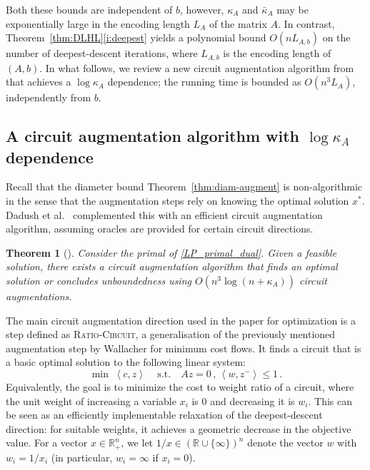 \documentclass[11pt, a4paper]{article}
\newcommand{\pr}[2]{\left\langle #1, #2 \right\rangle}
\newcommand{\1}{\mathbbm{1}}
\newtheorem{theorem}{Theorem}[section]
\theoremstyle{case}
\newcommand{\R}{\mathbb{R}}
\begin{document}
Both these bounds are independent of $b$, however, $\kappa_A$ and $\bar\kappa_A$ may be exponentially large in the encoding length $L_A$ of the matrix $A$. In contrast, Theorem~\ref{thm:DLHL}\ref{i:deepest} yields a polynomial bound $O(n L_{A,b})$ on the number of deepest-descent iterations, where $L_{A,b}$ is the encoding length of $(A,b)$. In what follows, we review a new circuit augmentation algorithm from \cite{dadush2021circuit} that achieves a $\log\kappa_A$ dependence; the running time is bounded as $O(n^3 L_A)$, independently from $b$.

\subsection{A circuit augmentation algorithm with $\log\kappa_A$ dependence}\label{sec:log-kappa}
Recall that the diameter bound Theorem~\ref{thm:diam-augment} is non-algorithmic in the sense that the augmentation steps rely on knowing the optimal solution $x^*$.
Dadush et al.~\cite{dadush2021circuit} complemented this with an efficient circuit augmentation algorithm, assuming oracles are provided for certain circuit directions.

\begin{theorem}[\cite{dadush2021circuit}]\label{thm:opt-augment}
    Consider the primal of \ref{LP_primal_dual}. Given a feasible solution, there exists a circuit augmentation algorithm that finds an optimal solution or concludes unboundedness using $O(n^3\log(n+\kappa_A))$ circuit augmentations.
\end{theorem}
	The main circuit augmentation direction used in the paper for optimization is a step defined as \textsc{Ratio-Circuit}, a generalisation of the previously mentioned augmentation step by Wallacher \cite{Wallacher} for minimum cost flows.
It finds a circuit that is a basic optimal solution to the following linear system:
\begin{equation}
    \label{sys:minratio-i}
    \min \; \pr{c}{z}\, \quad \mathrm{s.t.}\quad
    Az =0\, , \, 
    \pr{w}{z^-}  \leq 1\, .
\end{equation}
Equivalently, the goal is to minimize the cost to weight ratio of a circuit, where the unit weight of increasing a variable $x_i$ is $0$ and decreasing it is $w_i$. This can be seen as an efficiently implementable relaxation of the  deepest-descent direction: for suitable weights, it achieves a geometric decrease in the objective value. For a vector $x\in\R^n_+$, we let $1/x\in(\R\cup\{\infty\})^n$ denote the vector $w$ with $w_i=1/x_i$ (in particular, $w_i=\infty$ if $x_i=0$).
\end{document}
